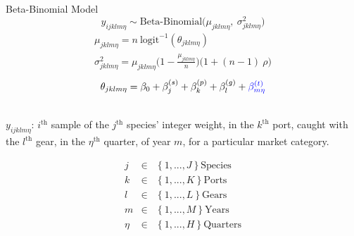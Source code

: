 \documentclass[ xcolor = pdftex, dvipsnames, table ]{beamer}
\begin{document}
\subsection{}
\begin{frame}{Beta-Binomial Model}
\vspace{-0.5cm}
\begin{equation*}
        y_{ijklm\eta} \sim \text{Beta-Binomial}\Big(\mu_{jklm\eta},~\sigma^2_{jklm\eta} \Big)
\end{equation*}
\vspace{-0.7cm}
\begin{gather*}
	\mu_{jklm\eta} = n~\text{logit}^{-1}(\theta_{jklm\eta})\\
	\sigma^2_{jklm\eta} = \mu_{jklm\eta}\Big(1-\frac{\mu_{jklm\eta}}{n}\Big)\Big(1+(n-1)~\rho\Big)
\end{gather*}
\vspace{-0.2cm}
\begin{equation*}
        \theta_{jklm\eta} = \beta_0 + \beta^{(s)}_j + \beta^{(p)}_k + \beta^{(g)}_l + \color{blue}{\beta^{(t)}_{m\eta}}%
\end{equation*}
\hspace{-0.5cm}
\begin{minipage}[h!]{0.55\textwidth}
	$~$\\
	$y_{ijklm\eta}$: $i^{\text{th}}$ sample of the $j^{\text{th}}$ species' integer weight, in the $k^{\text{th}}$ port, caught with the $l^{\text{th}}$ gear, in the $\eta^{\text{th}}$ \mbox{quarter,} of year $m$, for a particular market \mbox{category.}
\end{minipage}
\begin{minipage}{0.45\textwidth}
	\vspace{-0.5cm}
	\hspace{4cm}
        \begin{eqnarray*}
        j &\in&\left\{1, ..., J\right\} \text{Species}\\
        k &\in&\left\{1, ..., K\right\} \text{Ports}\\
        l &\in&\left\{1, ..., L\right\} \text{Gears}\\
        m &\in&\left\{1, ..., M\right\} \text{Years}\\
        \eta &\in&\left\{1, ..., H\right\} \text{Quarters}
        \end{eqnarray*}
\end{minipage}
\end{frame}
\end{document}
